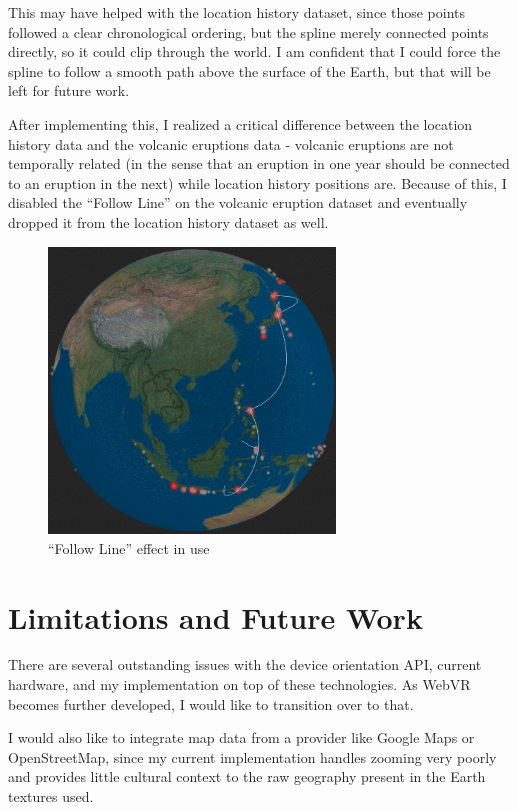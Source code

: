 \documentclass[conference]{acmsiggraph}
\begin{document}
This may have helped with the location history dataset, since those points
followed a clear chronological ordering, but the spline merely connected points
directly, so it could clip through the world. I am confident that I could
force the spline to follow a smooth path above the surface of the Earth, but
that will be left for future work.

After implementing this, I realized a critical difference between the location
history data and the volcanic eruptions data - volcanic eruptions are not
temporally related (in the sense that an eruption in one year should be
connected to an eruption in the next) while location history positions are.
Because of this, I disabled the ``Follow Line'' on the volcanic eruption dataset
and eventually dropped it from the location history dataset as well.

\begin{figure}
  \centering
  \includegraphics[width=3.0in]{images/follow_line}
  \caption{``Follow Line'' effect in use}
\end{figure}

\section{Limitations and Future Work}

There are several outstanding issues with the device orientation API, current
hardware, and my implementation on top of these technologies. As WebVR becomes
further developed, I would like to transition over to that.

I would also like to integrate map data from a provider like Google Maps or
OpenStreetMap, since my current implementation handles zooming very poorly and
provides little cultural context to the raw geography present in the Earth
textures used.
\end{document}
